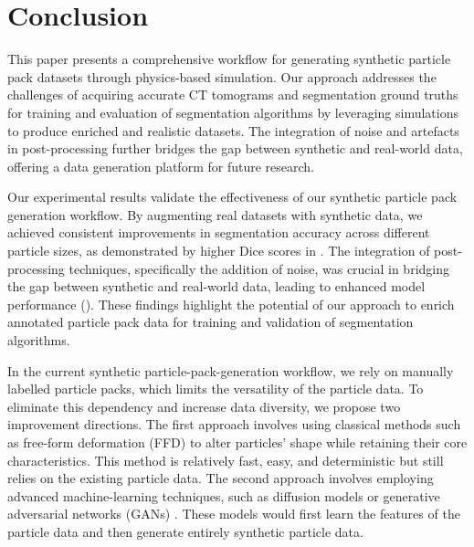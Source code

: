 \documentclass[preprint,12pt]{elsarticle}
\begin{document}
\section{Conclusion}
This paper presents a comprehensive workflow for generating synthetic particle pack datasets through physics-based simulation. 
Our approach addresses the challenges of acquiring accurate CT tomograms and segmentation ground truths for training and evaluation of segmentation algorithms by leveraging simulations to produce enriched and realistic datasets. 
The integration of noise and artefacts in post-processing further bridges the gap between synthetic and real-world data, offering a data generation platform for future research. 
\par
Our experimental results validate the effectiveness of our synthetic particle pack generation workflow. 
By augmenting real datasets with synthetic data, we achieved consistent improvements in segmentation accuracy across different particle sizes, as demonstrated by higher Dice scores in . 
The integration of post-processing techniques, specifically the addition of noise, was crucial in bridging the gap between synthetic and real-world data, leading to enhanced model performance (). 
These findings highlight the potential of our approach to enrich annotated particle pack data for training and validation of segmentation algorithms.
\par
In the current synthetic particle-pack-generation workflow, we rely on manually labelled particle packs, which limits the versatility of the particle data. 
To eliminate this dependency and increase data diversity, we propose two improvement directions. 
The first approach involves using classical methods such as free-form deformation (FFD) \cite{sederberg1986free} to alter particles' shape while retaining their core characteristics. 
This method is relatively fast, easy, and deterministic but still relies on the existing particle data.
The second approach involves employing advanced machine-learning techniques, such as diffusion models \cite{ho2020denoising} or generative adversarial networks (GANs) \cite{goodfellow2014generativea}. 
These models would first learn the features of the particle data and then generate entirely synthetic particle data. 

\end{document}
